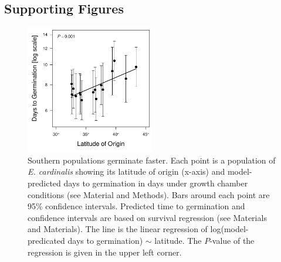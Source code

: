 \documentclass[11pt, oneside]{article}
\begin{document}
\clearpage


\subsection*{Supporting Figures}


	
\begin{figure}[h!]
	\centerline{\includegraphics[width=0.5\textwidth]{Figures/FigureS_GermLat.pdf}}
	\fontsize{10}{12}
	\selectfont
	\caption[Southern populations germinate faster]{Southern populations germinate faster. Each point is a population of \textit{E. cardinalis} showing its latitude of origin (x-axis) and model-predicted days to germination in days under growth chamber conditions (see Material and Methods). Bars around each point are 95\% confidence intervals. Predicted time to germination and confidence intervals are based on survival regression (see Materials and Materials). The line is the linear regression of log(model-predicated days to germination) $\sim$ latitude. The $P$-value of the regression is given in the upper left corner.}
	\label{fig:FigS_GermLat}
\end{figure}
\end{document}
